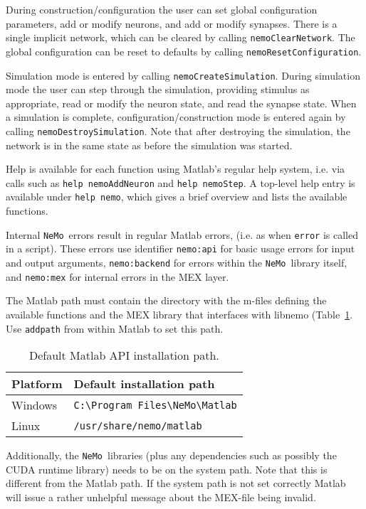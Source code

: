 \documentclass[a4paper]{article}
\newcommand{\nemo}{\texttt{NeMo}}
\newcommand{\code}[1]{\texttt{#1}}
\newcommand{\file}[1]{\texttt{#1}}
\begin{document}
During construction/configuration the user can
	set global configuration parameters,
	add or modify neurons, and
	add or modify synapses.
There is a single implicit network,
	which can be cleared by calling \code{nemoClearNetwork}.
The global configuration can be reset to defaults by calling \code{nemoResetConfiguration}.

Simulation mode is entered by calling \code{nemoCreateSimulation}.
During simulation mode the user can
	step through the simulation, providing stimulus as appropriate,
	read or modify the neuron state, and
	read the synapse state.
When a simulation is complete, configuration/construction mode is entered again
	by calling \code{nemoDestroySimulation}.
Note that after destroying the simulation,
	the network is in the same state as before the simulation was started.

Help is available for each function using Matlab's regular help system,
	i.e. via calls such as
		\code{help nemoAddNeuron}
		and \code{help nemoStep}.
A top-level help entry is available under \code{help nemo},
	which gives a brief overview and lists the available functions.

Internal \nemo\ errors result in regular Matlab errors,
	(i.e. as when \code{error} is called in a script).
These errors use identifier
	\code{nemo:api} for basic usage errors for input and output arguments,
	\code{nemo:backend} for errors within the \nemo\ library itself, and
	\code{nemo:mex} for internal errors in the MEX layer.

The Matlab path must contain the directory with the m-files
	defining the available functions and the MEX library that interfaces with libnemo
	(Table~\ref{tab:matlab-path}.
Use \code{addpath} from within Matlab to set this path.

\begin{table}[!hb]
	\centering
	\begin{tabular}{ll}
		Platform & Default installation path \\
		\hline
		Windows & \file{C:\textbackslash Program Files\textbackslash NeMo\textbackslash Matlab} \\
		Linux & \file{/usr/share/nemo/matlab} \\
		\hline
	\end{tabular}
	\caption{Default Matlab API installation path.}
	\label{tab:matlab-path}
\end{table}

Additionally, the \nemo\ libraries (plus any dependencies such as possibly the CUDA runtime library)
	needs to be on the system path.
Note that this is different from the Matlab path.
If the system path is not set correctly Matlab will issue a rather unhelpful message about the MEX-file being invalid.
\end{document}
